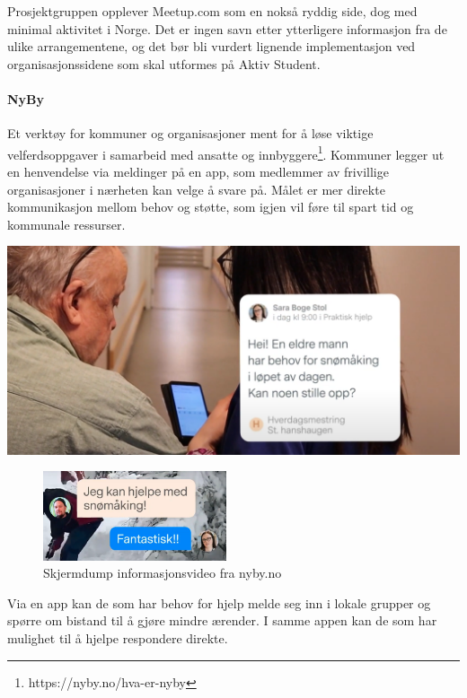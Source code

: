 Prosjektgruppen opplever Meetup.com som en nokså ryddig side, dog med minimal aktivitet i Norge. Det er ingen savn etter ytterligere informasjon fra de ulike arrangementene, og det bør bli vurdert lignende implementasjon ved organisasjonssidene som skal utformes på Aktiv Student.

\paragraph{NyBy} Et verktøy for kommuner og organisasjoner ment for å løse viktige velferdsoppgaver i samarbeid med ansatte og innbyggere\footnote{https://nyby.no/hva-er-nyby}. Kommuner legger ut en henvendelse via meldinger på en app, som medlemmer av frivillige organisasjoner i nærheten kan velge å svare på. Målet er mer direkte kommunikasjon mellom behov og støtte, som igjen vil føre til spart tid og kommunale ressurser.

\vspace{5mm} %

\includegraphics[width=\textwidth]{Illustrasjoner/andre_platformer/nyby_henvendelse.png}

\vspace{5mm} %
\begin{figure}
  \begin{center}
    \includegraphics[width=0.48\textwidth]{Illustrasjoner/andre_platformer/nyby_svar.png}
  \end{center}
  \caption{Skjermdump informasjonsvideo fra nyby.no}
\end{figure}
Via en app kan de som har behov for hjelp melde seg inn i lokale grupper og spørre om bistand til å gjøre mindre ærender. I samme appen kan de som har mulighet til å hjelpe respondere direkte.

